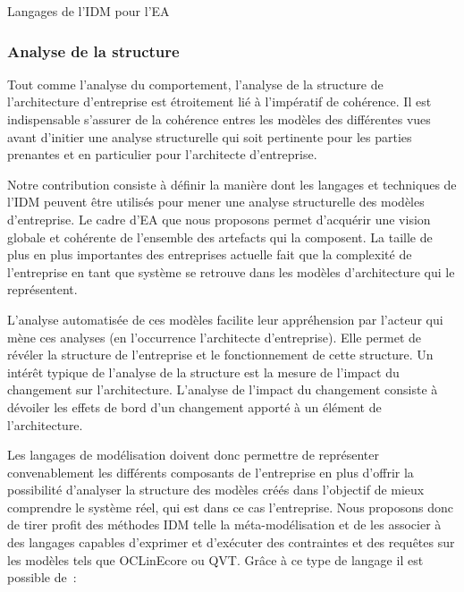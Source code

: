 \begin{table}[!ht]
    \begin{center}
        
    \end{center}
    \caption{Langages de l'IDM pour l'EA}
    \label{fig:IDM_EA}
\end{table}

        \subsubsection{Analyse de la structure}
Tout comme l'analyse du comportement,
l'analyse de la structure de l'architecture d'entreprise est étroitement lié à
l'impératif de cohérence. Il est indispensable s'assurer de la cohérence
entres les modèles des différentes vues avant d'initier une analyse
structurelle qui soit pertinente pour les parties prenantes et en particulier
pour l'architecte d'entreprise.

Notre contribution consiste à définir la manière dont les langages et techniques
de l'IDM peuvent être utilisés pour mener une analyse structurelle des modèles
d'entreprise. Le cadre d'EA que nous proposons permet d'acquérir une vision
globale et cohérente de l'ensemble des artefacts qui la composent. La taille de
plus en plus importantes des entreprises actuelle fait que la complexité de
l'entreprise en tant que système se retrouve dans les modèles d'architecture qui
le représentent.

L'analyse automatisée de ces modèles facilite leur appréhension par l'acteur qui
mène ces analyses (en l'occurrence l'architecte d'entreprise). Elle permet de
révéler la structure de l'entreprise et le fonctionnement de cette structure. Un
intérêt typique de l'analyse de la structure est la mesure de l'impact du
changement \cite{de2005change} sur l'architecture. L'analyse de l'impact du
changement consiste à dévoiler les effets de bord d'un changement apporté à un
élément de l'architecture.

Les langages de modélisation doivent donc permettre de représenter
convenablement les différents composants de l'entreprise en plus d'offrir la
possibilité d'analyser la structure des modèles créés dans l'objectif de mieux
comprendre le système réel, qui est dans ce cas l'entreprise. Nous proposons
donc de tirer profit des méthodes IDM telle la méta-modélisation et de les
associer à des langages capables d'exprimer et d'exécuter des contraintes et des
requêtes sur les modèles tels que OCLinEcore ou QVT. Grâce à ce type de langage
il est possible de~:

